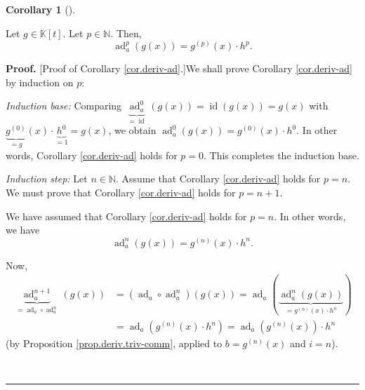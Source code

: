 \documentclass[numbers=enddot,12pt,final,onecolumn,notitlepage]{scrartcl}%
\theoremstyle{definition}
\newtheorem{coro}[theo]{Corollary}
\newenvironment{corollary}[1][]
{\begin{coro}[#1]\begin{leftbar}}
{\end{leftbar}\end{coro}}
\newenvironment{proof}[1][Proof]{\noindent\textbf{#1.} }{\ \rule{0.5em}{0.5em}}
\begin{document}
\begin{corollary}
\label{cor.deriv-ad}Let $g\in\mathbb{K}\left[  t\right]  $. Let $p\in
\mathbb{N}$. Then,%
\[
\operatorname*{ad}\nolimits_{a}^{p}\left(  g\left(  x\right)  \right)
=g^{\left(  p\right)  }\left(  x\right)  \cdot h^{p}.
\]

\end{corollary}

\begin{proof}
[Proof of Corollary \ref{cor.deriv-ad}.]We shall prove Corollary
\ref{cor.deriv-ad} by induction on $p$:

\textit{Induction base:} Comparing $\underbrace{\operatorname*{ad}%
\nolimits_{a}^{0}}_{=\operatorname*{id}}\left(  g\left(  x\right)  \right)
=\operatorname*{id}\left(  g\left(  x\right)  \right)  =g\left(  x\right)  $
with $\underbrace{g^{\left(  0\right)  }}_{=g}\left(  x\right)  \cdot
\underbrace{h^{0}}_{=1}=g\left(  x\right)  $, we obtain $\operatorname*{ad}%
\nolimits_{a}^{0}\left(  g\left(  x\right)  \right)  =g^{\left(  0\right)
}\left(  x\right)  \cdot h^{0}$. In other words, Corollary \ref{cor.deriv-ad}
holds for $p=0$. This completes the induction base.

\textit{Induction step:} Let $n\in\mathbb{N}$. Assume that Corollary
\ref{cor.deriv-ad} holds for $p=n$. We must prove that Corollary
\ref{cor.deriv-ad} holds for $p=n+1$.

We have assumed that Corollary \ref{cor.deriv-ad} holds for $p=n$. In other
words, we have%
\[
\operatorname*{ad}\nolimits_{a}^{n}\left(  g\left(  x\right)  \right)
=g^{\left(  n\right)  }\left(  x\right)  \cdot h^{n}.
\]


Now,%
\begin{align}
\underbrace{\operatorname*{ad}\nolimits_{a}^{n+1}}_{=\operatorname*{ad}%
\nolimits_{a}\circ\operatorname*{ad}\nolimits_{a}^{n}}\left(  g\left(
x\right)  \right)   &  =\left(  \operatorname*{ad}\nolimits_{a}\circ
\operatorname*{ad}\nolimits_{a}^{n}\right)  \left(  g\left(  x\right)
\right)  =\operatorname*{ad}\nolimits_{a}\left(
\underbrace{\operatorname*{ad}\nolimits_{a}^{n}\left(  g\left(  x\right)
\right)  }_{=g^{\left(  n\right)  }\left(  x\right)  \cdot h^{n}}\right)
\nonumber\\
&  =\operatorname*{ad}\nolimits_{a}\left(  g^{\left(  n\right)  }\left(
x\right)  \cdot h^{n}\right)  =\operatorname*{ad}\nolimits_{a}\left(
g^{\left(  n\right)  }\left(  x\right)  \right)  \cdot h^{n}
\label{pf.cor.deriv-ad.2}%
\end{align}
(by Proposition \ref{prop.deriv.triv-comm}, applied to $b=g^{\left(  n\right)
}\left(  x\right)  $ and $i=n$).


\end{proof}
\end{document}
